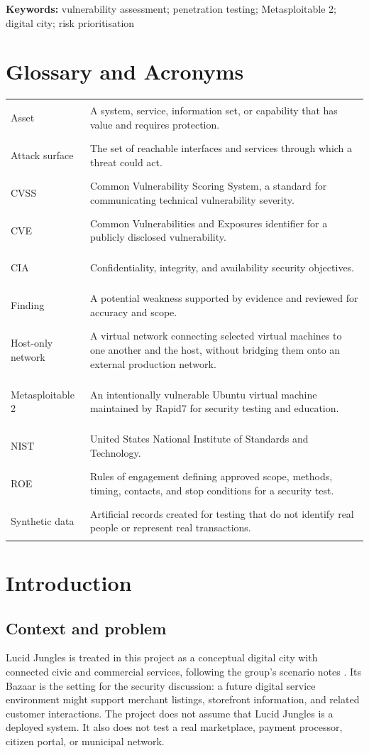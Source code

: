 \documentclass[11pt,a4paper]{article}
\begin{document}
\textbf{Keywords:} vulnerability assessment; penetration testing; Metasploitable 2; digital city; risk prioritisation

\section*{Glossary and Acronyms}
\begin{tabularx}{\textwidth}{>{\bfseries\raggedright\arraybackslash}p{3cm}Y}
Asset & A system, service, information set, or capability that has value and requires protection.\\
Attack surface & The set of reachable interfaces and services through which a threat could act.\\
CVSS & Common Vulnerability Scoring System, a standard for communicating technical vulnerability severity.\\
CVE & Common Vulnerabilities and Exposures identifier for a publicly disclosed vulnerability.\\
CIA & Confidentiality, integrity, and availability security objectives.\\
Finding & A potential weakness supported by evidence and reviewed for accuracy and scope.\\
Host-only network & A virtual network connecting selected virtual machines to one another and the host, without bridging them onto an external production network.\\
Metasploitable 2 & An intentionally vulnerable Ubuntu virtual machine maintained by Rapid7 for security testing and education.\\
NIST & United States National Institute of Standards and Technology.\\
ROE & Rules of engagement defining approved scope, methods, timing, contacts, and stop conditions for a security test.\\
Synthetic data & Artificial records created for testing that do not identify real people or represent real transactions.\\
\end{tabularx}

\clearpage
\tableofcontents
\clearpage
{}

\section{Introduction}
\subsection{Context and problem}
Lucid Jungles is treated in this project as a conceptual digital city with connected civic and commercial services, following the group's scenario notes \citep{lucidjungles2026}. Its Bazaar is the setting for the security discussion: a future digital service environment might support merchant listings, storefront information, and related customer interactions. The project does not assume that Lucid Jungles is a deployed system. It also does not test a real marketplace, payment processor, citizen portal, or municipal network.
\end{document}
